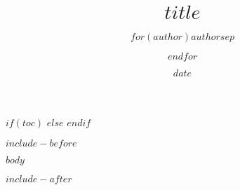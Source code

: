 \documentclass[]{bxjsarticle}
\title{$title$}
\author{$for(author)$$author$$sep$\and $endfor$}
\date{$date$}
\begin{document}
\maketitle
\thispagestyle{empty}
\clearpage
\addtocounter{page}{-1}

$if(toc)$
\tableofcontents
$else$
$endif$

$include-before$

$body$

$include-after$
\end{document}
